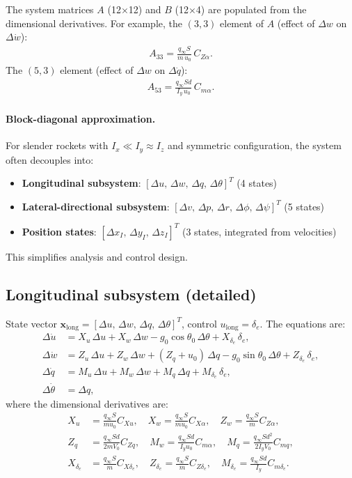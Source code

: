 \documentclass[11pt]{article}
\begin{document}
The system matrices $A$ (12$\times$12) and $B$ (12$\times$4) are populated from the dimensional derivatives. For example, the $(3,3)$ element of $A$ (effect of $\Delta w$ on $\Delta\dot w$):
\begin{align}
A_{33} = \frac{q_\infty S}{m\,u_0}\,C_{Z\alpha}.
\end{align}
The $(5,3)$ element (effect of $\Delta w$ on $\Delta\dot q$):
\begin{align}
A_{53} = \frac{q_\infty Sd}{I_y\,u_0}\,C_{m\alpha}.
\end{align}

\paragraph{Block-diagonal approximation.}
For slender rockets with $I_x \ll I_y\approx I_z$ and symmetric configuration, the system often decouples into:
\begin{itemize}[leftmargin=2em]
\item \textbf{Longitudinal subsystem}: $[\Delta u,\,\Delta w,\,\Delta q,\,\Delta\theta]^T$ (4 states)
\item \textbf{Lateral-directional subsystem}: $[\Delta v,\,\Delta p,\,\Delta r,\,\Delta\phi,\,\Delta\psi]^T$ (5 states)
\item \textbf{Position states}: $[\Delta x_I,\,\Delta y_I,\,\Delta z_I]^T$ (3 states, integrated from velocities)
\end{itemize}
This simplifies analysis and control design.

\subsection{Longitudinal subsystem (detailed)}
State vector $\mathbf{x}_{\text{long}}=[\Delta u,\,\Delta w,\,\Delta q,\,\Delta\theta]^T$, control $u_{\text{long}}=\delta_e$. The equations are:
\begin{align}
\Delta\dot u &= X_u\,\Delta u + X_w\,\Delta w - g_0\cos\theta_0\,\Delta\theta + X_{\delta_e}\,\delta_e,\\
\Delta\dot w &= Z_u\,\Delta u + Z_w\,\Delta w + (Z_q+u_0)\,\Delta q - g_0\sin\theta_0\,\Delta\theta + Z_{\delta_e}\,\delta_e,\\
\Delta\dot q &= M_u\,\Delta u + M_w\,\Delta w + M_q\,\Delta q + M_{\delta_e}\,\delta_e,\\
\Delta\dot\theta &= \Delta q,
\end{align}
where the dimensional derivatives are:
\begin{align}
X_u &= \frac{q_\infty S}{m u_0}C_{Xu},\quad
X_w = \frac{q_\infty S}{m u_0}C_{X\alpha},\quad
Z_w = \frac{q_\infty S}{m}C_{Z\alpha},\\
Z_q &= \frac{q_\infty S d}{2mV_0}C_{Zq},\quad
M_w = \frac{q_\infty Sd}{I_y u_0}C_{m\alpha},\quad
M_q = \frac{q_\infty Sd^2}{2I_y V_0}C_{mq},\\
X_{\delta_e} &= \frac{q_\infty S}{m}C_{X\delta_e},\quad
Z_{\delta_e} = \frac{q_\infty S}{m}C_{Z\delta_e},\quad
M_{\delta_e} = \frac{q_\infty Sd}{I_y}C_{m\delta_e}.
\end{align}
\end{document}
